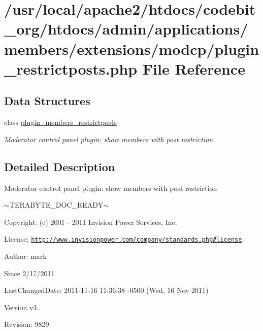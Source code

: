 \hypertarget{plugin__restrictposts_8php}{\section{/usr/local/apache2/htdocs/codebit\-\_\-org/htdocs/admin/applications/members/extensions/modcp/plugin\-\_\-restrictposts.php File Reference}
\label{plugin__restrictposts_8php}
}
\subsection*{Data Structures}
\begin{DoxyCompactItemize}
\item 
class \hyperlink{classplugin__members__restrictposts}{plugin\-\_\-members\-\_\-restrictposts}
\begin{DoxyCompactList}\small\item\em Moderator control panel plugin\-: show members with post restriction. \end{DoxyCompactList}\end{DoxyCompactItemize}


\subsection{Detailed Description}
\begin{DoxyVerb}  Moderator control panel plugin: show members with post restriction
\end{DoxyVerb}
 $\sim$\-T\-E\-R\-A\-B\-Y\-T\-E\-\_\-\-D\-O\-C\-\_\-\-R\-E\-A\-D\-Y$\sim$ \begin{DoxyParagraph}{Copyright\-:}
(c) 2001 -\/ 2011 Invision Power Services, Inc.
\end{DoxyParagraph}
\begin{DoxyParagraph}{License\-:}
\href{http://www.invisionpower.com/company/standards.php#license}{\tt http\-://www.\-invisionpower.\-com/company/standards.\-php\#license}
\end{DoxyParagraph}
\begin{DoxyParagraph}{Author\-:}
mark 
\end{DoxyParagraph}
\begin{DoxySince}{Since}
2/17/2011 
\end{DoxySince}
\begin{DoxyParagraph}{Last\-Changed\-Date\-:}
2011-\/11-\/16 11\-:36\-:38 -\/0500 (Wed, 16 Nov 2011) 
\end{DoxyParagraph}
\begin{DoxyVersion}{Version}
v3.. 
\end{DoxyVersion}
\begin{DoxyParagraph}{Revision\-:}
9829 
\end{DoxyParagraph}
